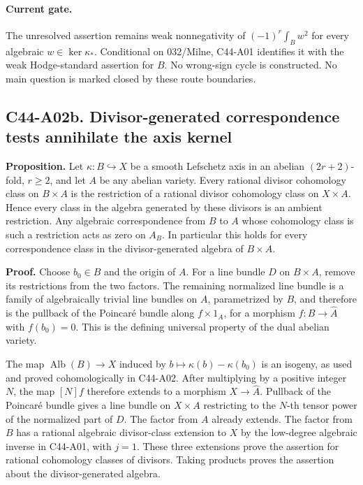 \documentclass[11pt]{article}
\theoremstyle{remark}\newtheorem{remark}[theorem]{Remark}
\begin{document}
\paragraph{Current gate.}
The unresolved assertion remains weak nonnegativity of
$(-1)^r\int_Bw^2$ for every algebraic $w\in\ker\kappa_*$.
Conditional on 032/Milne, C44-A01 identifies it with the weak
Hodge-standard assertion for $B$. No wrong-sign cycle is
constructed. No main question is marked closed by these
route boundaries.


\subsection*{C44-A02b. Divisor-generated correspondence tests annihilate the axis kernel}

\textbf{Proposition.}
Let $\kappa:B\hookrightarrow X$ be a smooth Lefschetz axis in an
abelian $(2r+2)$-fold, $r\ge2$, and let $A$ be any abelian variety.
Every rational divisor cohomology class on $B\times A$ is the
restriction of a rational divisor cohomology class on $X\times A$.
Hence every class
in the algebra generated by these divisors is an ambient
restriction. Any algebraic correspondence from $B$ to $A$ whose
cohomology class is such a restriction acts as zero on $A_B$.
In particular this holds for every correspondence class in the
divisor-generated algebra of $B\times A$.

\textbf{Proof.}
Choose $b_0\in B$ and the origin of $A$. For a line bundle $D$
on $B\times A$, remove its restrictions from the two factors.
The remaining normalized line bundle is a family of
algebraically trivial line bundles on $A$, parametrized by $B$,
and therefore is the pullback of the Poincar\'e bundle along
$f\times1_A$, for a morphism $f:B\to\widehat A$ with
$f(b_0)=0$. This is the defining universal property of the dual
abelian variety.

The map $\operatorname{Alb}(B)\to X$ induced by
$b\mapsto\kappa(b)-\kappa(b_0)$ is an isogeny, as used and
proved cohomologically in C44-A02. After multiplying by a
positive integer $N$, the map $[N]f$ therefore extends to a
morphism $X\to\widehat A$. Pullback of the Poincar\'e bundle
gives a line bundle on $X\times A$ restricting to the $N$-th
tensor power of the normalized part of $D$.
The factor from $A$ already extends. The factor from $B$ has
a rational algebraic divisor-class extension to $X$ by the
low-degree algebraic inverse in C44-A01, with $j=1$.
These three extensions prove the assertion for rational
cohomology classes of divisors. Taking products proves the
assertion about the divisor-generated algebra.
\end{document}
